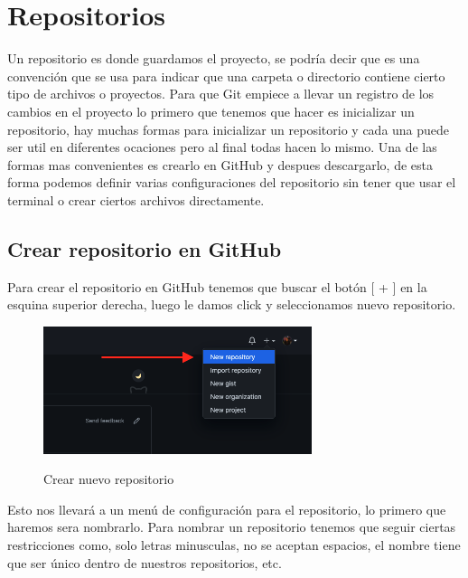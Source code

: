 \documentclass[11pt, oneside]{article}
\begin{document}
\section{Repositorios}
Un repositorio es donde guardamos el proyecto, se podría decir que es una convención que se usa para indicar que una carpeta o directorio contiene cierto tipo de archivos o proyectos. Para que Git empiece a llevar un registro de los cambios en el proyecto lo primero que tenemos que hacer es inicializar un repositorio, hay muchas formas para inicializar un repositorio y cada una puede ser util en diferentes ocaciones pero al final todas hacen lo mismo. Una de las formas mas convenientes es crearlo en GitHub y despues descargarlo, de esta forma podemos definir varias configuraciones del repositorio sin tener que usar el terminal o crear ciertos archivos directamente. 

\subsection{Crear repositorio en GitHub}

Para crear el repositorio en GitHub tenemos que buscar el botón [ + ] en la esquina superior derecha, luego le damos click y seleccionamos nuevo repositorio.

\begin{figure}[H]
  \centering
  \caption{Crear nuevo repositorio}
  \includegraphics[width=0.70\textwidth]{./img/github-new-repo-1.png}
  \label{fig:github-new-repo-1}
\end{figure}

Esto nos llevará a un menú de configuración para el repositorio, lo primero que haremos sera nombrarlo. Para nombrar un repositorio tenemos que seguir ciertas restricciones como, solo letras minusculas, no se aceptan espacios, el nombre tiene que ser único dentro de nuestros repositorios, etc.
\end{document}
